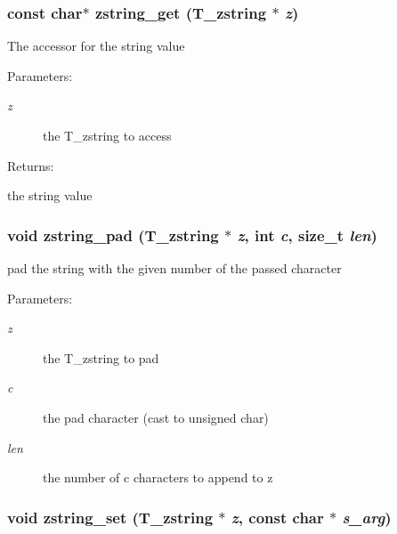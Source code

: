 \subsubsection{\setlength{\rightskip}{0pt plus 5cm}const char$\ast$ zstring\_\-get ({\bf T\_\-zstring} $\ast$ {\em z})}\label{zstring_8h_a5}


The accessor for the string value\begin{Desc}
\item[Parameters: ]\par
\begin{description}
\item[{\em 
z}]the T\_\-zstring to access \end{description}
\end{Desc}
\begin{Desc}
\item[Returns: ]\par
the string value \end{Desc}
\subsubsection{\setlength{\rightskip}{0pt plus 5cm}void zstring\_\-pad ({\bf T\_\-zstring} $\ast$ {\em z}, int {\em c}, size\_\-t {\em len})}\label{zstring_8h_a7}


pad the string with the given number of the passed character \begin{Desc}
\item[Parameters: ]\par
\begin{description}
\item[{\em 
z}]the T\_\-zstring to pad \item[{\em 
c}]the pad character (cast to unsigned char) \item[{\em 
len}]the number of c characters to append to z \end{description}
\end{Desc}
\subsubsection{\setlength{\rightskip}{0pt plus 5cm}void zstring\_\-set ({\bf T\_\-zstring} $\ast$ {\em z}, const char $\ast$ {\em s\_\-arg})}\label{zstring_8h_a3}


